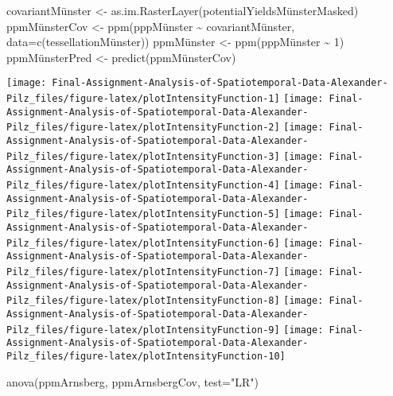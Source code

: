 \documentclass[
]{article}
\newenvironment{Shaded}{\begin{snugshade}}{\end{snugshade}}
\newcommand{\AttributeTok}[1]{\textcolor[rgb]{0.77,0.63,0.00}{#1}}
\newcommand{\DecValTok}[1]{\textcolor[rgb]{0.00,0.00,0.81}{#1}}
\newcommand{\FunctionTok}[1]{\textcolor[rgb]{0.00,0.00,0.00}{#1}}
\newcommand{\NormalTok}[1]{#1}
\newcommand{\OtherTok}[1]{\textcolor[rgb]{0.56,0.35,0.01}{#1}}
\newcommand{\SpecialCharTok}[1]{\textcolor[rgb]{0.00,0.00,0.00}{#1}}
\newcommand{\StringTok}[1]{\textcolor[rgb]{0.31,0.60,0.02}{#1}}
\begin{document}
\begin{Shaded}
\begin{Highlighting}[]
\NormalTok{covariantMünster }\OtherTok{\textless{}{-}} \FunctionTok{as.im.RasterLayer}\NormalTok{(potentialYieldsMünsterMasked)}
\NormalTok{ppmMünsterCov }\OtherTok{\textless{}{-}} \FunctionTok{ppm}\NormalTok{(pppMünster }\SpecialCharTok{\textasciitilde{}}\NormalTok{ covariantMünster, }\AttributeTok{data=}\FunctionTok{c}\NormalTok{(tessellationMünster))}
\NormalTok{ppmMünster }\OtherTok{\textless{}{-}} \FunctionTok{ppm}\NormalTok{(pppMünster }\SpecialCharTok{\textasciitilde{}} \DecValTok{1}\NormalTok{)}
\NormalTok{ppmMünsterPred }\OtherTok{\textless{}{-}} \FunctionTok{predict}\NormalTok{(ppmMünsterCov)}
\end{Highlighting}
\end{Shaded}

\texttt{[image: Final-Assignment-Analysis-of-Spatiotemporal-Data-Alexander-Pilz\_files/figure-latex/plotIntensityFunction-1]}
\texttt{[image: Final-Assignment-Analysis-of-Spatiotemporal-Data-Alexander-Pilz\_files/figure-latex/plotIntensityFunction-2]}
\texttt{[image: Final-Assignment-Analysis-of-Spatiotemporal-Data-Alexander-Pilz\_files/figure-latex/plotIntensityFunction-3]}
\texttt{[image: Final-Assignment-Analysis-of-Spatiotemporal-Data-Alexander-Pilz\_files/figure-latex/plotIntensityFunction-4]}
\texttt{[image: Final-Assignment-Analysis-of-Spatiotemporal-Data-Alexander-Pilz\_files/figure-latex/plotIntensityFunction-5]}
\texttt{[image: Final-Assignment-Analysis-of-Spatiotemporal-Data-Alexander-Pilz\_files/figure-latex/plotIntensityFunction-6]}
\texttt{[image: Final-Assignment-Analysis-of-Spatiotemporal-Data-Alexander-Pilz\_files/figure-latex/plotIntensityFunction-7]}
\texttt{[image: Final-Assignment-Analysis-of-Spatiotemporal-Data-Alexander-Pilz\_files/figure-latex/plotIntensityFunction-8]}
\texttt{[image: Final-Assignment-Analysis-of-Spatiotemporal-Data-Alexander-Pilz\_files/figure-latex/plotIntensityFunction-9]}
\texttt{[image: Final-Assignment-Analysis-of-Spatiotemporal-Data-Alexander-Pilz\_files/figure-latex/plotIntensityFunction-10]}

\begin{Shaded}
\begin{Highlighting}[]
\FunctionTok{anova}\NormalTok{(ppmArnsberg, ppmArnsbergCov, }\AttributeTok{test=}\StringTok{"LR"}\NormalTok{)}
\end{Highlighting}
\end{Shaded}
\end{document}
